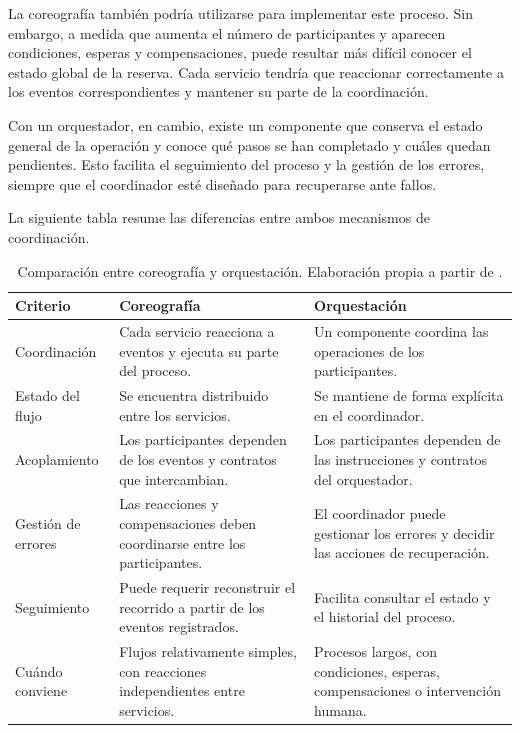 La coreografía también podría utilizarse para implementar este proceso. Sin embargo, a medida que aumenta el número de participantes y aparecen condiciones, esperas y compensaciones, puede resultar más difícil conocer el estado global de la reserva. Cada servicio tendría que reaccionar correctamente a los eventos correspondientes y mantener su parte de la coordinación.

Con un orquestador, en cambio, existe un componente que conserva el estado general de la operación y conoce qué pasos se han completado y cuáles quedan pendientes. Esto facilita el seguimiento del proceso y la gestión de los errores, siempre que el coordinador esté diseñado para recuperarse ante fallos.

La siguiente tabla resume las diferencias entre ambos mecanismos de coordinación.

\begin{table}[H]
    \centering
    \footnotesize
    \renewcommand{\arraystretch}{1.25}
    \begin{tabular}{@{}p{3.2cm} p{5.8cm} p{5.8cm}@{}}
        \toprule
        \textbf{Criterio} & \textbf{Coreografía} & \textbf{Orquestación} \\
        \midrule
        Coordinación & Cada servicio reacciona a eventos y ejecuta su parte del proceso. & Un componente coordina las operaciones de los participantes. \\
        \addlinespace
        Estado del flujo & Se encuentra distribuido entre los servicios. & Se mantiene de forma explícita en el coordinador. \\
        \addlinespace
        Acoplamiento & Los participantes dependen de los eventos y contratos que intercambian. & Los participantes dependen de las instrucciones y contratos del orquestador. \\
        \addlinespace
        Gestión de errores & Las reacciones y compensaciones deben coordinarse entre los participantes. & El coordinador puede gestionar los errores y decidir las acciones de recuperación. \\
        \addlinespace
        Seguimiento & Puede requerir reconstruir el recorrido a partir de los eventos registrados. & Facilita consultar el estado y el historial del proceso. \\
        \addlinespace
        Cuándo conviene & Flujos relativamente simples, con reacciones independientes entre servicios. & Procesos largos, con condiciones, esperas, compensaciones o intervención humana. \\
        \bottomrule
    \end{tabular}
    \caption{Comparación entre coreografía y orquestación. Elaboración propia a partir de \parencite{ford2021hard,richards2020fundamentals}.}
    \label{tab:coreografia-orquestacion}
\end{table}


